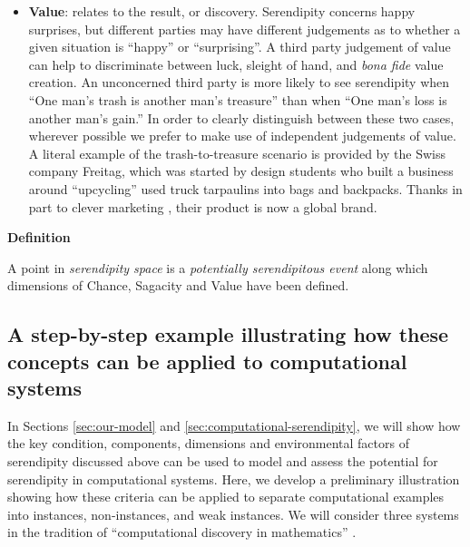 \begin{itemize}
\item \textbf{Value}: relates to the result, or discovery. Serendipity
  concerns happy surprises, but different parties may have different
  judgements as to whether a given situation is ``happy'' or
  ``surprising''.  A third party judgement of value can help to
  discriminate between luck, sleight of hand, and \emph{bona fide}
  value creation.  An unconcerned third party is more likely to see
  serendipity when ``One man's trash is another man's treasure'' than
  when ``One man's loss is another man's gain.''  In order to clearly
  distinguish between these two cases, wherever possible we prefer to
  make use of independent judgements of value.  A literal example of
  the trash-to-treasure scenario is provided by the Swiss company
  Freitag, which was started by design students who built a business
  around ``upcycling'' used truck tarpaulins into bags and backpacks.
  Thanks in part to clever marketing \cite[pp. 54--55,
  68--69]{russo2010companies}, their product is now a global brand.
\end{itemize}



\begin{mdframed}
{\bf Definition}

A point in {\em serendipity space} is a {\em potentially serendipitous
  event} along which dimensions of Chance, Sagacity and Value have
been defined. 
\end{mdframed}




\subsection{A step-by-step example illustrating how these concepts can
  be applied to computational systems} \label{sec:by-example-summary}

In Sections \ref{sec:our-model} and
\ref{sec:computational-serendipity}, we will show how the key
condition, components, dimensions and environmental factors of
serendipity discussed above can be used to model and assess the
potential for serendipity in computational systems.
Here, we develop a preliminary illustration showing how these criteria can be
applied to separate computational examples into instances, non-instances, and
weak instances.
We will consider three systems in the tradition of ``computational
discovery in mathematics'' \cite{colton2007computational}.

